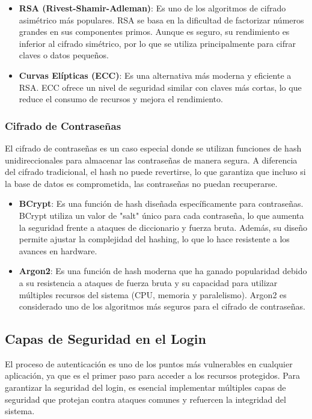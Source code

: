 \documentclass[draft]{scrbook}
\begin{document}
\begin{itemize}
    \item \textbf{RSA (Rivest-Shamir-Adleman)}: Es uno de los algoritmos de cifrado asimétrico más populares. RSA se basa en la dificultad de factorizar números grandes en sus componentes primos. Aunque es seguro, su rendimiento es inferior al cifrado simétrico, por lo que se utiliza principalmente para cifrar claves o datos pequeños.
    \item \textbf{Curvas Elípticas (ECC)}: Es una alternativa más moderna y eficiente a RSA. ECC ofrece un nivel de seguridad similar con claves más cortas, lo que reduce el consumo de recursos y mejora el rendimiento.
\end{itemize}

\subsubsection{Cifrado de Contraseñas}

El cifrado de contraseñas es un caso especial donde se utilizan funciones de hash unidireccionales para almacenar las contraseñas de manera segura. A diferencia del cifrado tradicional, el hash no puede revertirse, lo que garantiza que incluso si la base de datos es comprometida, las contraseñas no puedan recuperarse.

\begin{itemize}
    \item \textbf{BCrypt}: Es una función de hash diseñada específicamente para contraseñas. BCrypt utiliza un valor de "salt" único para cada contraseña, lo que aumenta la seguridad frente a ataques de diccionario y fuerza bruta. Además, su diseño permite ajustar la complejidad del hashing, lo que lo hace resistente a los avances en hardware.
    \item \textbf{Argon2}: Es una función de hash moderna que ha ganado popularidad debido a su resistencia a ataques de fuerza bruta y su capacidad para utilizar múltiples recursos del sistema (CPU, memoria y paralelismo). Argon2 es considerado uno de los algoritmos más seguros para el cifrado de contraseñas.
\end{itemize}

\subsection{Capas de Seguridad en el Login}
\label{subsec:capas-seguridad-login}

El proceso de autenticación es uno de los puntos más vulnerables en cualquier aplicación, ya que es el primer paso para acceder a los recursos protegidos. Para garantizar la seguridad del login, es esencial implementar múltiples capas de seguridad que protejan contra ataques comunes y refuercen la integridad del sistema.
\end{document}
